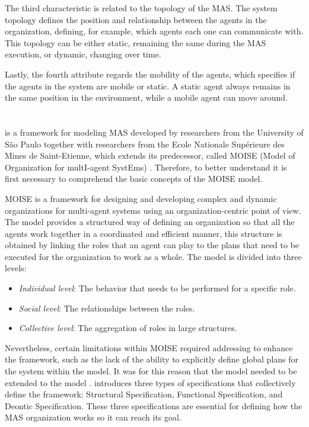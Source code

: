 The third characteristic is related to the topology of the MAS. The system topology defines the position and relationship between the agents in the organization, defining, for example, which agents each one can communicate with. This topology can be either static, remaining the same during the MAS execution, or dynamic, changing over time.

Lastly, the fourth attribute regards the mobility of the agents, which specifies if the agents in the system are mobile or static. A static agent always remains in the same position in the environment, while a mobile agent can move around.

\section[\MOISEp]{\MOISEpBf}

\MOISEp \cite{MOISEp} is a framework for modeling MAS developed by researchers from the University of São Paulo together with researchers from the Ecole Nationale Supérieure des Mines de Saint-Etienne, which extends its predecessor, called MOISE (Model of Organization for multI-agent SystEms) \cite{Moise}. Therefore, to better understand \MOISEp it is first necessary to comprehend the basic concepts of the MOISE model.

MOISE is a framework for designing and developing complex and dynamic organizations for multi-agent systems using an organization-centric point of view. The model provides a structured way of defining an organization so that all the agents work together in a coordinated and efficient manner, this structure is obtained by linking the roles that an agent can play to the plans that need to be executed for the organization to work as a whole. The model is divided into three levels:

\begin{itemize}
    \item \textit{Individual level}: The behavior that needs to be performed for a specific role.
    \item \textit{Social level}: The relationships between the roles.
    \item \textit{Collective level}: The aggregation of roles in large structures.
\end{itemize}

Nevertheless, certain limitations within MOISE required addressing to enhance the framework, such as the lack of the ability to explicitly define global plans for the system within the model. It was for this reason that the model needed to be extended to the \MOISEp model \cite{MOISEp}. \MOISEp introduces three types of specifications that collectively define the framework: Structural Specification, Functional Specification, and Deontic Specification. These three specifications are essential for defining how the MAS organization works so it can reach its goal.

